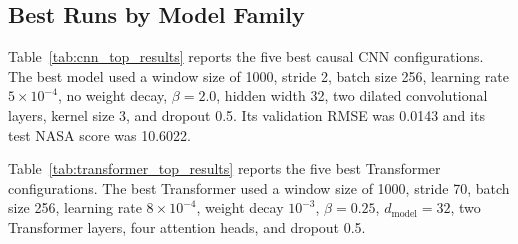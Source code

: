 \documentclass[11pt,a4paper]{article}
\begin{document}
\subsection{Best Runs by Model Family}

Table~\ref{tab:cnn_top_results} reports the five best causal CNN configurations. The best model used a window size of 1000, stride 2, batch size 256, learning rate $5\times10^{-4}$, no weight decay, $\beta=2.0$, hidden width 32, two dilated convolutional layers, kernel size 3, and dropout 0.5. Its validation RMSE was 0.0143 and its test NASA score was 10.6022.

\begin{table}[htbp]
\centering
\caption{Top causal CNN runs ranked by NASA score. Results are taken from the saved CNN run CSV.}
\label{tab:cnn_top_results}
\end{table}

Table~\ref{tab:transformer_top_results} reports the five best Transformer configurations. The best Transformer used a window size of 1000, stride 70, batch size 256, learning rate $8\times10^{-4}$, weight decay $10^{-3}$, $\beta=0.25$, $d_{\mathrm{model}}=32$, two Transformer layers, four attention heads, and dropout 0.5.
\end{document}
